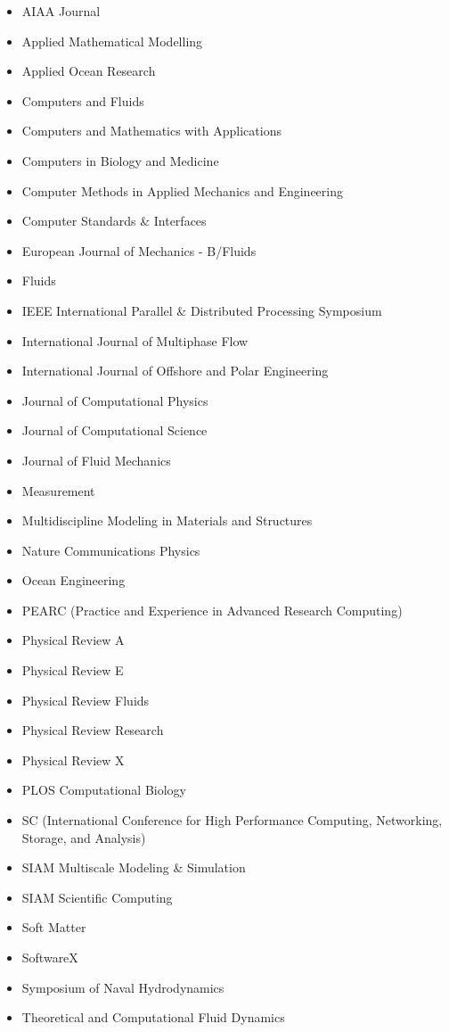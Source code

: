 \vspace{-0.5cm}
\begin{multicols}{2}
\begin{itemize}
    \item AIAA Journal
    \item Applied Mathematical Modelling
    \item Applied Ocean Research
    \item Computers and Fluids
    \item Computers and Mathematics with Applications
    \item Computers in Biology and Medicine
    \item Computer Methods in Applied Mechanics and Engineering
    \item Computer Standards \& Interfaces 
    \item European Journal of Mechanics - B/Fluids
    \item Fluids
    \item IEEE International Parallel \& Distributed Processing Symposium
    \item International Journal of Multiphase Flow
    \item International Journal of Offshore and Polar Engineering
    \item Journal of Computational Physics
    \item Journal of Computational Science
    \item Journal of Fluid Mechanics
    \item Measurement
    \item Multidiscipline Modeling in Materials and Structures
    \item Nature Communications Physics
    \item Ocean Engineering
    \item PEARC (Practice and Experience in Advanced Research Computing)
    \item Physical Review A
    \item Physical Review E
    \item Physical Review Fluids
    \item Physical Review Research
    \item Physical Review X
    \item PLOS Computational Biology
    \item SC (International Conference for High Performance Computing, Networking, Storage, and Analysis)
    \item SIAM Multiscale Modeling \& Simulation
    \item SIAM Scientific Computing
    \item Soft Matter
    \item SoftwareX
    \item Symposium of Naval Hydrodynamics
    \item Theoretical and Computational Fluid Dynamics
\end{itemize}
\end{multicols}

